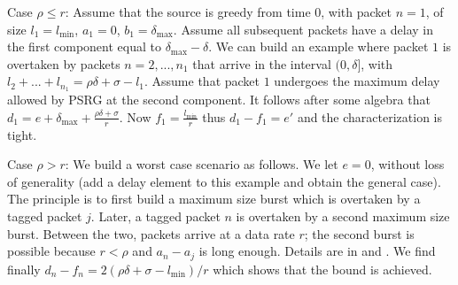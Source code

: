 \begin{preuve}
Case $\rho \leq r$: Assume that the source is greedy from time
0, with packet $n=1$, of size $l_1=l_{\min}$, $a_1=0$,
$b_1=\delta_{\max}$. Assume all subsequent packets have a
delay in the first component equal to $\delta_{\max}-\delta$.
We can build an example where packet $1$ is overtaken by
packets $n=2, ...,n_1$ that arrive in the interval $(0,
\delta]$, with $l_2 + ... + l_{n_1}= \rho \delta + \sigma -
l_1$. Assume that packet $1$ undergoes the maximum delay
allowed by PSRG at the second component. It follows after some
algebra that $d_1=e+ \delta_{\max}+\frac{\rho \delta +
\sigma}{r}$. Now $f_1=\frac{ l_{\min}}{r}$ thus $d_1-f_1=e'$
and the characterization is tight.

Case $\rho > r$: We build a worst case scenario as follows. We
let $e=0$, without loss of generality (add a delay element to
this example and obtain the general case). The principle is to
first build a maximum size burst which is overtaken by a
tagged packet $j$. Later, a tagged packet $n$ is overtaken by
a second maximum size burst. Between the two, packets arrive
at a data rate $r$; the second burst is possible because $r<
\rho$ and $a_n-a_j$ is long enough. Details are in
 and . We find finally $d_n-f_n=
2(\rho \delta +\sigma - l_{\min})/r$ which shows that the
bound is achieved.
\begin{figure}[!htbp]
\end{figure}
{\small

}
\end{preuve}

